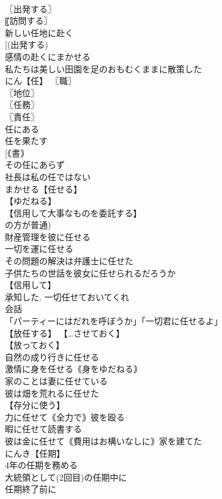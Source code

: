 \documentclass[8pt]{extreport}
\begin{document}
\begin{CJK}{UTF8}{min}
\\	〖出発する〗
\\	〖訪問する〗
\\	新しい任地に赴く 
\\	[(出発する) 
\\	感情の赴くにまかせる 
\\	私たちは美しい田園を足のおもむくままに散策した 
\\	にん【任】 〖職〗
\\	〖地位〗
\\	〖任務〗
\\	〖責任〗
\\	任にある 
\\	任を果たす 
\\	[｟書｠ 
\\	その任にあらず 
\\	社長は私の任ではない 
\\	まかせる【任せる】 
\\	【ゆだねる】 
\\	【信用して大事なものを委託する】
\\	の方が普通) 
\\	財産管理を彼に任せる 
\\	一切を運に任せる 
\\	その問題の解決は弁護士に任せた 
\\	子供たちの世話を彼女に任せられるだろうか 
\\	【信用して】
\\	承知した. 一切任せておいてくれ 
\\	会話 
\\	「パーティーにはだれを呼ぼうか」「一切君に任せるよ」 
\\	【放任する】 【…させておく】
\\	【放っておく】
\\	自然の成り行きに任せる 
\\	激情に身を任せる｟身をゆだねる｠ 
\\	家のことは妻に任せている 
\\	彼は畑を荒れるに任せた 
\\	【存分に使う】 
\\	力に任せて｟全力で｠彼を殴る 
\\	暇に任せて読書する 
\\	彼は金に任せて｟費用はお構いなしに｠家を建てた 
\\	にんき【任期】 
\\	4年の任期を務める 
\\	大統領として(2回目)の任期中に 
\\	任期終了前に 

\end{CJK}
\end{document}
